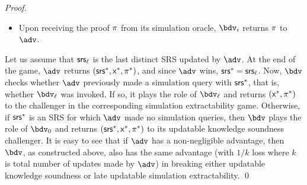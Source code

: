 \begin{proof}
\begin{itemize}
		\item
		Upon receiving the proof $\pi$ from its simulation oracle, $\bdv_i$ returns $\pi$ to $\advse$.
		
	\end{itemize}
	
	
	Let us assume that $\mathsf{srs}_\ell$ is the last distinct SRS updated by $\advse$. 
	At the end of the game, $\advse$ returns $(\mathsf{srs}^*, \mathsf{x}^*, \pi^*)$, and since $\advse$ wins, $\mathsf{srs}^* = \mathsf{srs}_\ell$. Now, $\bdv$ checks whether 
	$\advse$ previously made a simulation query with
	$\mathsf{srs}^*$, that is, whether $\bdv_\ell$ was invoked. 
	If so, it plays the role of $\bdv_\ell$ and returns $(\mathsf{x}^*, \pi^*)$ to the challenger in the corresponding simulation extractability game. 
	Otherwise, if $\mathsf{srs}^*$ is an SRS for which $\advse$ made no simulation queries, then $\bdv$ plays the role of $\bdv_0$ and returns $(\mathsf{srs}^*, \mathsf{x}^*, \pi^*)$ to its updatable knowledge soundness challenger. It is easy to see that if $\advse$ has a non-negligible advantage, then $\bdv$, as constructed above, also has the same advantage (with $1/k$ loss where $k$ is total number of updates made by $\advse$) in breaking either updatable knowledge soundness or late updatable simulation extractability.
\qed
\end{proof}